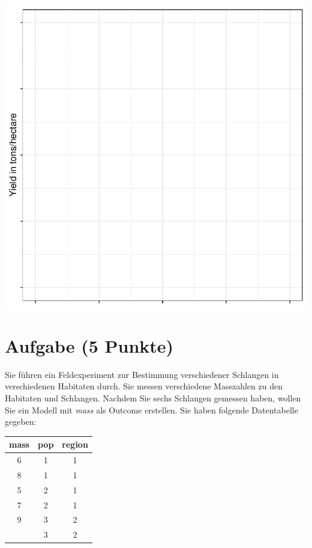 \documentclass[a4paper, 10pt]{scrartcl}\usepackage[]{graphicx}\usepackage[]{xcolor}
\makeatletter
\def\maxwidth{ %
  \ifdim\Gin@nat@width>\linewidth
    \linewidth
  \else
    \Gin@nat@width
  \fi
}
\newenvironment{knitrout}{}{} %
\makeatother
\begin{document}
{\centering \includegraphics[width=\maxwidth]{img/modeling-R-01-1} 

}


 
\clearpage

\section{Aufgabe \hfill (5 Punkte)}



Sie f{\"u}hren ein Feldexperiment zur Bestimmung verschiedener Schlangen in
verschiedenen Habitaten durch. Sie messen verschiedene Masszahlen zu den
Habitaten und Schlangen. Nachdem Sie sechs Schlangen gemessen haben, wollen
Sie ein Modell mit \textit{mass} als Outcome erstellen. Sie haben folgende
Datentabelle gegeben:

\begin{knitrout}
\color{fgcolor}\begin{table}[!h]
\centering
\begin{tabular}{ccc}
\toprule
mass & pop & region\\
\midrule
6 & 1 & 1\\
8 & 1 & 1\\
5 & 2 & 1\\
7 & 2 & 1\\
9 & 3 & 2\\
\addlinespace
11 & 3 & 2\\
\bottomrule
\end{tabular}
\end{table}

\end{knitrout}
\end{document}
